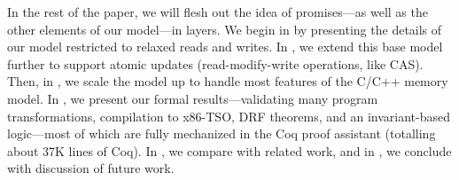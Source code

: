 



In the rest of the paper, we will flesh out the idea of promises---as
well as the other elements of our model---in layers.  We begin in
 by presenting the details of our model restricted
to relaxed reads and writes.  In , we extend this
base model further to support atomic updates (\ie read-modify-write
operations, like CAS).  Then, in , we scale the model
up to handle most features of the C/C++ memory model.  In
, we present our formal results---validating many
program transformations, compilation to x86-TSO, DRF
theorems, and an invariant-based logic---most of which are fully
mechanized in the Coq proof assistant (totalling about 37K lines of
Coq).  In , we compare with related work, and in
, we conclude with discussion of future work.


